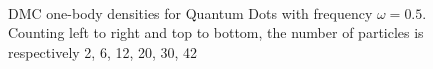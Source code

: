 \begin{figure}
\begin{center}
   \\
  \caption{DMC one-body densities for Quantum Dots with frequency $\omega=0.5$. Counting left to right and top to bottom, the number of particles is respectively 2, 6, 12, 20, 30, 42}
  \label{fig:OBD_DMC_QDOTS_w05}
 \end{center}
\end{figure}


